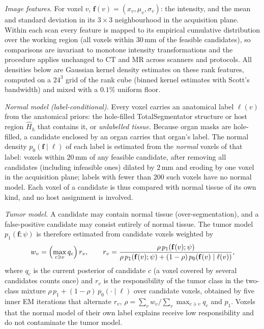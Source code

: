 \documentclass[fleqn,10pt]{olplainarticle}
\begin{document}
\textit{Image features.} For voxel $v$, $\mathbf{f}(v)=(x_v,\mu_v,\sigma_v)$: the intensity, and the mean and standard
deviation in its $3\times3$ neighbourhood in the acquisition plane. Within each scan every feature is mapped to its
empirical cumulative distribution over the working region (all voxels within $30$\,mm of the feasible candidates), so
comparisons are invariant to monotone intensity transformations and the procedure applies unchanged to CT and MR across
scanners and protocols. All densities below are Gaussian kernel density estimates on these rank features, computed on a
$24^3$ grid of the rank cube (binned kernel estimates with Scott's bandwidth) and mixed with a $0.1\%$ uniform floor.

\textit{Normal model (label-conditional).} Every voxel carries an anatomical label $\ell(v)$ from the anatomical priors: the
hole-filled TotalSegmentator structure or host region $\hat H_h$ that contains it, or \emph{unlabelled tissue}. Because
organ masks are hole-filled, a candidate enclosed by an organ carries that organ's label. The normal density
$p_0(\mathbf{f}\mid\ell)$ of each label is estimated from the \emph{normal} voxels of that label: voxels within $20$\,mm of
any feasible candidate, after removing all candidates (including infeasible ones) dilated by $2$\,mm and eroding by one voxel
in the acquisition plane; labels with fewer than $200$ such voxels have no normal model. Each voxel of a candidate is thus
compared with normal tissue of its own kind, and no host assignment is involved.

\textit{Tumor model.} A candidate may contain normal tissue (over-segmentation), and a false-positive candidate may consist
entirely of normal tissue. The tumor model $p_1(\mathbf{f};\psi)$ is therefore estimated from candidate voxels weighted by
\begin{equation}
\label{eq:tumor_weights}
w_v=\Bigl(\max_{c\ni v}q_c\Bigr)\,r_v,\qquad
r_v=\frac{\rho\,p_1(\mathbf{f}(v);\psi)}{\rho\,p_1(\mathbf{f}(v);\psi)+(1-\rho)\,p_0(\mathbf{f}(v)\mid\ell(v))},
\end{equation}
where $q_c$ is the current posterior of candidate $c$ (a voxel covered by several candidates counts once) and $r_v$ is the
responsibility of the tumor class in the two-class mixture $\rho\,p_1+(1-\rho)\,p_0(\cdot\mid\ell)$ over candidate voxels,
obtained by five inner EM iterations that alternate $r_v$, $\rho=\sum_v w_v/\sum_v\max_{c\ni v}q_c$ and $p_1$. Voxels that
the normal model of their own label explains receive low responsibility and do not contaminate the tumor model.
\end{document}
